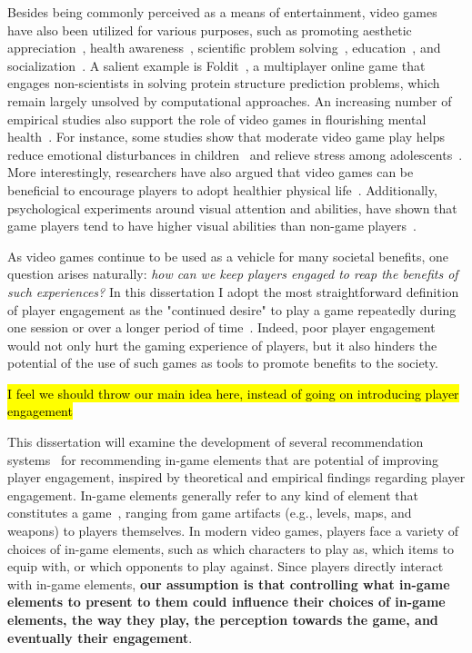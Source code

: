 Besides being commonly perceived as a means of entertainment, video games have also been utilized for various purposes, such as promoting aesthetic appreciation~\cite{jarvinen2008understanding}, health awareness~\cite{shiyko2016effects}, scientific problem solving~\cite{cooper2010predicting}, education~\cite{gee2003video}, and socialization~\cite{ferguson2013friends}. A salient example is Foldit~\cite{cooper2010predicting}, a multiplayer online game that engages non-scientists in solving protein structure prediction problems, which remain largely unsolved by computational approaches. An increasing number of empirical studies also support the role of video games in flourishing mental health~\cite{jones2014gaming}. For instance, some studies show that moderate video game play helps reduce emotional disturbances in children~\cite{hull2009computer} and relieve stress among adolescents~\cite{colwell2007needs}. More interestingly, researchers have also argued that video games can be beneficial to encourage players to adopt healthier physical life~\cite{shiyko2016effects}. Additionally, psychological experiments around visual attention and abilities, have shown that game players tend to have higher visual abilities than non-game players~\cite{green2003action,li2009enhancing}.

As video games continue to be used as a vehicle for many societal benefits, one question arises naturally: \textit{how can we keep players engaged to reap the benefits of such experiences?} In this dissertation I adopt the most straightforward definition of player engagement as the "continued desire" to play a game repeatedly during one session or over a longer period of time~\cite{schoenau2011player}. Indeed, poor player engagement would not only hurt the gaming experience of players, but it also hinders the potential of the use of such games as tools to promote benefits to the society.  

\hl{I feel we should throw our main idea here, instead of going on introducing player engagement}

This dissertation will examine the development of several recommendation systems~\cite{medler2011using} for recommending in-game elements that are potential of improving player engagement, inspired by theoretical and empirical findings regarding player engagement. In-game elements generally refer to any kind of element that constitutes a game~\cite{ralph2015toward,fullerton2008game}, ranging from game artifacts (e.g., levels, maps, and weapons) to players themselves. In modern video games, players face a variety of choices of in-game elements, such as which characters to play as, which items to equip with, or which opponents to play against. Since players directly interact with in-game elements, \textbf{our assumption is that controlling what in-game elements to present to them could influence their choices of in-game elements, the way they play, the perception towards the game, and eventually their engagement}. 

